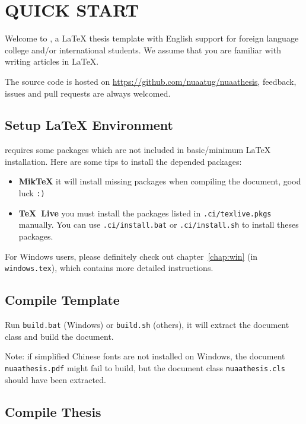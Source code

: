 
\chapter{QUICK START}

Welcome to \nuaathesis,
a \LaTeX{} thesis template with English support for foreign language college and/or international students.
We assume that you are familiar with writing articles in \LaTeX.

The source code is hosted on \url{https://github.com/nuaatug/nuaathesis},
feedback, issues and pull requests are always welcomed.

\section{Setup \LaTeX{} Environment}

\nuaathesis{} requires some packages which are not included in basic/minimum \LaTeX{} installation.
Here are some tips to install the depended packages:

\begin{itemize}
\item\textbf{Mik\TeX} it will install missing packages when compiling the document, good luck \verb|:)|
\item\textbf{\TeX~Live} you must install the packages listed in \verb|.ci/texlive.pkgs| manually.
You can use \verb|.ci/install.bat| or \verb|.ci/install.sh| to install theses packages.
\end{itemize}

For Windows users, please definitely check out chapter~\ref{chap:win} (in \verb|windows.tex|),
which contains more detailed instructions.

\section{Compile Template}

Run \verb|build.bat| (Windows) or \verb|build.sh| (others),
it will extract the document class and build the document.

Note:
if simplified Chinese fonts are not installed on Windows,
the document \texttt{nuaathesis.pdf} might fail to build,
but the document class \texttt{nuaathesis.cls} should have been extracted.

\section{Compile Thesis}

